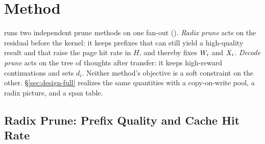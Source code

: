 \section{Method}
\label{sec:design}

\sys runs two independent prune methods on one fan-out ().
\emph{Radix prune} acts on the residual before the kernel: it keeps prefixes that can still yield a high-quality result and that raise the page hit rate in $H$, and thereby fixes $W_i$ and $X_i$.
\emph{Decode prune} acts on the tree of thoughts after transfer: it keeps high-reward continuations and sets $d_i$.
Neither method's objective is a soft constraint on the other.
\S\ref{sec:design-full} realizes the same quantities with a copy-on-write pool, a radix picture, and a span table.

\subsection{Radix Prune: Prefix Quality and Cache Hit Rate}
\label{sec:app}

